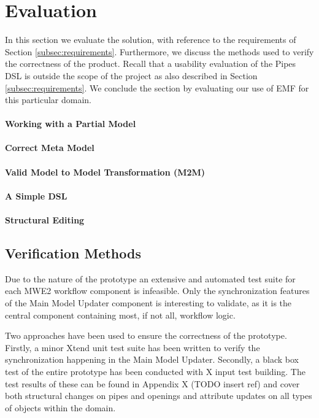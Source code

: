 \section{Evaluation}
In this section we evaluate the solution, with reference to the requirements of Section \ref{subsec:requirements}. Furthermore, we discuss the methods used to verify the correctness of the product. Recall that a usability evaluation of the Pipes DSL is outside the scope of the project as also described in Section \ref{subsec:requirements}. We conclude the section by evaluating our use of EMF for this particular domain.



\paragraph{Working with a Partial Model}
\paragraph{Correct Meta Model}
\paragraph{Valid Model to Model Transformation (M2M)}
\paragraph{A Simple DSL}
\paragraph{Structural Editing}


\subsection{Verification Methods}
Due to the nature of the prototype an extensive and automated test suite for each MWE2 workflow component is infeasible. Only the synchronization features of the Main Model Updater component is interesting to validate, as it is the central component containing most, if not all, workflow logic.

Two approaches have been used to ensure the correctness of the prototype. Firstly, a minor Xtend unit test suite has been written to verify the synchronization happening in the Main Model Updater. Secondly, a black box test of the entire prototype has been conducted with X input test building. The test results of these can be found in Appendix X (TODO insert ref) and cover both structural changes on pipes and openings and attribute updates on all types of objects within the domain.

